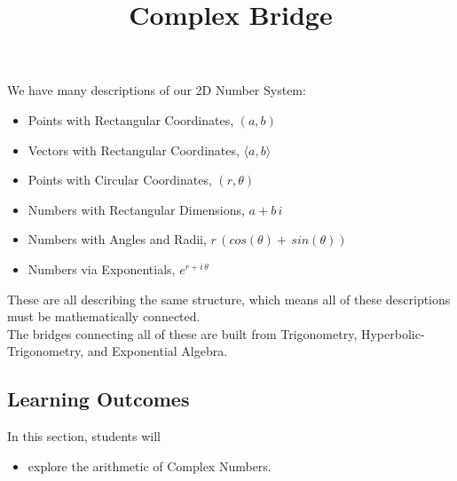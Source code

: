 \documentclass{ximera}
\title{Complex Bridge}
\begin{document}
\begin{abstract}
\end{abstract}
\maketitle




We have many descriptions of our 2D Number System:

\begin{itemize}
\item Points with Rectangular Coordinates, $(a,b)$
\item Vectors with Rectangular Coordinates, $\langle a, b \rangle$
\item Points with Circular Coordinates, $(r,\theta)$
\item Numbers with Rectangular Dimensions, $a + b \, i$
\item Numbers with Angles and Radii, $r \, (cos(\theta) + \, sin(\theta))$
\item Numbers via Exponentials, $e^{r + i \, \theta}$
\end{itemize}

These are all describing the same structure, which means all of these descriptions must be mathematically connected. \\


The bridges connecting all of these are built from Trigonometry, Hyperbolic-Trigonometry, and Exponential Algebra.





\subsection{Learning Outcomes}

\begin{sectionOutcomes}
In this section, students will 

\begin{itemize}
\item explore the arithmetic of Complex Numbers.
\end{itemize}
\end{sectionOutcomes}
\end{document}
